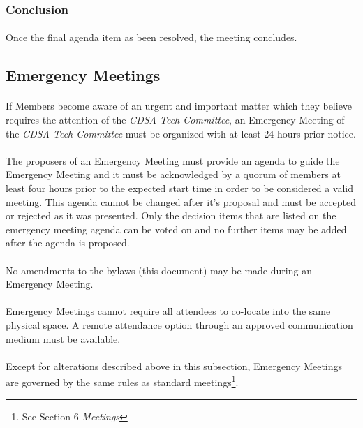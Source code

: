 \documentclass[12pt,letter,twocolumn,oneside,draft]{article}
\newcommand{\cname}{\emph{CDSA Tech Committee}}
\begin{document}
\subsubsection{Conclusion}

\paragraph{}
Once the final agenda item as been resolved, the meeting concludes.

\subsection{Emergency Meetings}

\paragraph{}
If Members become aware of an urgent and important matter which they believe
requires the attention of the \cname{}, an Emergency Meeting of the \cname{}
must be organized with at least 24 hours prior notice. 

\paragraph{}
The proposers of an Emergency Meeting must provide an agenda to guide the
Emergency Meeting and it must be acknowledged by a quorum of members at least
four hours prior to the expected start time in order to be considered a valid
meeting.  This agenda cannot be changed after it's proposal and must be
accepted or rejected as it was presented. Only the decision items that are
listed on the emergency meeting agenda can be voted on and no further items may
be added after the agenda is proposed. 

\paragraph{}
No amendments to the bylaws (this document) may be made during an Emergency
Meeting.

\paragraph{}
Emergency Meetings cannot require all attendees to co-locate into the same
physical space. A remote attendance option through an approved communication
medium must be available. 

\paragraph{}
Except for alterations described above in this subsection, Emergency Meetings
are governed by the same rules as standard meetings\footnote{See Section 6
\emph{Meetings}}.
\end{document}
